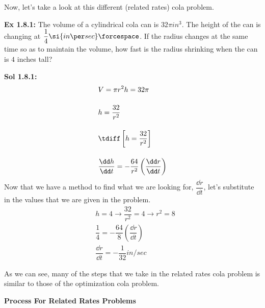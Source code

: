 Now, let's take a look at this different (related rates) cola problem.

\begin{tcolorbox}[example]
    \textbf{Ex 1.8.1: } The volume of a cylindrical cola can is $32\pi \si{in^3}$. The height of the can is changing at $\dfrac{1}{4} \si{in \per sec} \forcespace$. If the radius changes at the same time so as to maintain the volume, how fast is the radius shrinking when the can is $4$ inches tall? 
\end{tcolorbox} 
\begin{tcolorbox}[solution]
    \textbf{Sol 1.8.1: } \begin{align*}
        & V = \pi r^2h = 32\pi \\[11pt]
        & h = \dfrac{32}{r^2} \\[11pt]
        & \tdiff\left[h = \dfrac{32}{r^2}\right] \\[11pt]
        & \dfrac{\dd h}{\dd t} = -\dfrac{64}{r^2}\left(\dfrac{\dd r}{\dd t}\right)
    \end{align*}
    Now that we have a method to find what we are looking for, $\dfrac{\dd r}{\dd t}$, let's substitute in the values that we are given in the problem. \begin{align*}
        & h = 4 \rightarrow \dfrac{32}{r^2} = 4 \rightarrow r^2 = 8 \\[11pt]
        & \dfrac{1}{4} = -\dfrac{64}{8}\left(\dfrac{\dd r}{\dd t}\right) \\[11pt]
        & \dfrac{\dd r}{\dd t} = \boxed{-\dfrac{1}{32} \si{in \per sec}}
    \end{align*}
\end{tcolorbox}

As we can see, many of the steps that we take in the related rates cola problem is similar to those of the optimization cola problem. 

\textbf{Process For Related Rates Problems} \par

